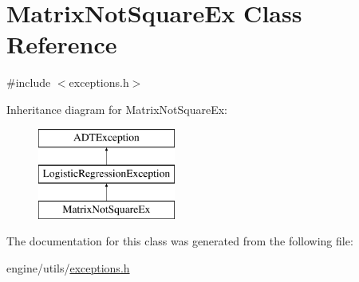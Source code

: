 \hypertarget{classMatrixNotSquareEx}{
\section{MatrixNotSquareEx Class Reference}
\label{classMatrixNotSquareEx}
}


{\ttfamily \#include $<$exceptions.h$>$}

Inheritance diagram for MatrixNotSquareEx:\begin{figure}[H]
\begin{center}
\leavevmode
\includegraphics[height=3cm]{classMatrixNotSquareEx}
\end{center}
\end{figure}


The documentation for this class was generated from the following file:\begin{DoxyCompactItemize}
\item 
engine/utils/\hyperlink{exceptions_8h}{exceptions.h}\end{DoxyCompactItemize}
